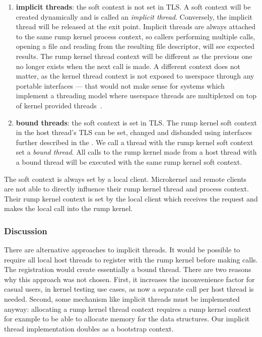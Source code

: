 \begin{enumerate}
\item \textbf{implicit threads}: the soft context is not set
in TLS.  A soft context will be created dynamically and is called
an \textit{implicit thread}.  Conversely, the implicit thread will be
released at the exit point.  Implicit threads are always attached to the
same rump kernel process context, so callers performing multiple calls,
\eg opening a file and reading from the resulting file descriptor,
will see expected results.  The rump kernel thread context will be
different as the previous one no longer exists when the next call
is made.  A different context does not matter, as the kernel thread
context is not exposed to userspace through any portable interfaces
--- that would not make sense for systems which implement a threading
model where userspace threads are multiplexed on top of kernel provided
threads~\cite{anderson:scheduler_activations}.

\item \textbf{bound threads}: the soft context is set in TLS.
The rump kernel soft context in the host thread's TLS can be set,
changed and disbanded using interfaces further described in the
.  We call a thread with the rump
kernel soft context set a \textit{bound thread}.  All calls to the rump
kernel made from a host thread with a bound thread will be executed with
the same rump kernel soft context.
\end{enumerate}

The soft context is always set by a local client.  Microkernel and
remote clients are not able to directly influence their rump kernel thread
and process context.  Their rump kernel context is set by the local client
which receives the request and makes the local call into the rump kernel.

\subsubsection*{Discussion}

There are alternative approaches to implicit threads.  It would
be possible to require all local host threads to register with the rump
kernel before making calls.  The registration would create essentially
a bound thread.  There are two reasons why this approach was not chosen.
First, it increases the inconvenience factor for casual users, \eg
in kernel testing use cases, as
now a separate call per host thread is needed.  Second, some mechanism
like implicit threads must be implemented anyway: allocating a rump
kernel thread context requires a rump kernel context for example to be
able to allocate memory for the data structures.  Our implicit thread
implementation doubles as a bootstrap context.

